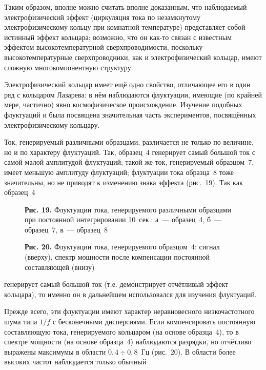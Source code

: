 \documentclass[12pt,a4paper]{article}
\begin{document}
Таким образом, вполне можно считать вполне доказанным, что наблюдаемый
электрофизический эффект (циркуляция тока по незамкнутому электрофизическому
кольцу при комнатной температуре) представляет собой истинный эффект кольцара;
возможно, что он как-то связан с известным эффектом высокотемпературной
сверхпроводимости, поскольку высокотемпературные сверхпроводники, как и
электрофизический кольцар, имеют сложную многокомпонентную структуру.

Электрофизический кольцар имеет ещё одно свойство, отличающее его в один ряд
с кольцаром Лазарева: в нём наблюдаются флуктуации, имеющие (по крайней мере,
частично) явно космофизическое происхождение. Изучение подобных флуктуаций и
была посвящена значительная часть экспериментов, посвящённых электрофизическому
кольцару.

Ток, генерируемый различными образцами, различается не только по величине, но
и по характеру флуктуаций. Так, образец~4 генерирует самый большой ток с самой
малой амплитудой флуктуаций; такой же ток, генерируемый образцом~7, имеет
меньшую амплитуду флуктуаций; флуктуации тока образца~8 тоже значительны, но
не приводят к изменению знака эффекта (рис.~19). Так как образец~4

\begin{figure}[h]
\centering
\caption*{\textbf{Рис. 19.} Флуктуации тока, генерируемого различными образцами
при постоянной интегрировании 10~сек.: а~— образец~4, б~— образец~7,
в~— образец~8}
\end{figure}

\begin{figure}[h]
\centering
\caption*{\textbf{Рис. 20.} Флуктуации тока, генерируемого образцом~4: сигнал
(вверху), спектр мощности после компенсации постоянной составляющей (внизу)}
\end{figure}

\newpage

генерирует самый большой ток (т.е. демонстрирует отчётливый эффект кольцара),
то именно он в дальнейшем использовался для изучения флуктуаций.

Прежде всего, эти флуктуации имеют характер неравновесного низкочастотного
шума типа $1/f$ с бесконечными дисперсиями. Если компенсировать постоянную
составляющую тока, генерируемого кольцаром (на основе образца~4), то в
спектре мощности (на основе образца~4) наблюдаются разрядки, но отчётливо
выражены максимумы в области $0{,}4 \div 0{,}8$~Гц (рис.~20). В области
более высоких частот наблюдается только обычный
\end{document}
